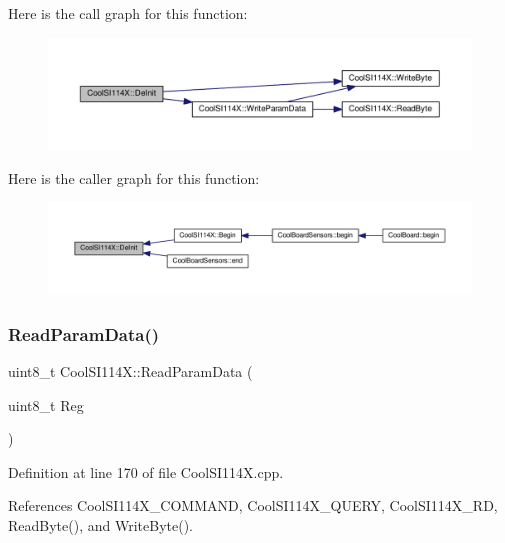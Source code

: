 Here is the call graph for this function\+:
\nopagebreak
\begin{figure}[H]
\begin{center}
\leavevmode
\includegraphics[width=350pt]{dd/d67/class_cool_s_i114_x_a6840abd53a2e3d71a6bb918077c6d6e6_cgraph}
\end{center}
\end{figure}
Here is the caller graph for this function\+:
\nopagebreak
\begin{figure}[H]
\begin{center}
\leavevmode
\includegraphics[width=350pt]{dd/d67/class_cool_s_i114_x_a6840abd53a2e3d71a6bb918077c6d6e6_icgraph}
\end{center}
\end{figure}
\mbox{\label{class_cool_s_i114_x_a33cf431103c722442f6a0cc93848d640}} 
\subsubsection{\texorpdfstring{Read\+Param\+Data()}{ReadParamData()}}
{\footnotesize\ttfamily uint8\+\_\+t Cool\+S\+I114\+X\+::\+Read\+Param\+Data (\begin{DoxyParamCaption}\item[{uint8\+\_\+t}]{Reg }\end{DoxyParamCaption})}



Definition at line 170 of file Cool\+S\+I114\+X.\+cpp.



References Cool\+S\+I114\+X\+\_\+\+C\+O\+M\+M\+A\+ND, Cool\+S\+I114\+X\+\_\+\+Q\+U\+E\+RY, Cool\+S\+I114\+X\+\_\+\+RD, Read\+Byte(), and Write\+Byte().

